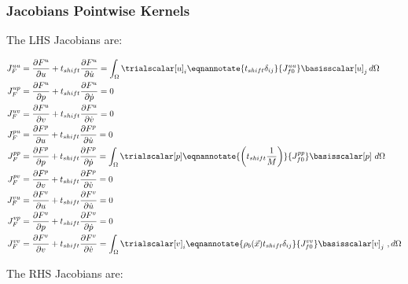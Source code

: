 \subsubsection{Jacobians Pointwise Kernels}

The LHS Jacobians are:

\begin{align}
J_F^{uu} &= \frac{\partial F^u}{\partial u} + t_{shift} \frac{\partial F^u}{\partial \dot{u}} =
\int_{\Omega} \trialscalar[u]_{i} \eqnannotate{t_{shift} \delta_{ij}}{J^{uu}_{f0}} \basisscalar[u]_{j} \, d \Omega \\
%
J_F^{up} &= \frac{\partial F^u}{\partial p} + t_{shift} \frac{\partial F^u}{\partial \dot{p}} = 0 \\
%
J_F^{uv} &= \frac{\partial F^u}{\partial v} + t_{shift} \frac{\partial F^u}{\partial \dot{v}} = 0 \\
%
J_F^{pu} &= \frac{\partial F^p}{\partial u} + t_{shift} \frac{\partial F^p}{\partial \dot{u}} = 0 \\
J_F^{pp} &= \frac{\partial F^p}{\partial p} + t_{shift} \frac{\partial F^p}{\partial \dot{p}} = \int_{\Omega} \trialscalar[p]
\eqnannotate{\left(t_{shift} \frac{1}{M}\right)}{J_{f0}^{pp}} \basisscalar[p] \ d\Omega \\
%
J_F^{pv} &= \frac{\partial F^p}{\partial v} + t_{shift} \frac{\partial F^p}{\partial \dot{v}} = 0 \\
%
J_F^{vu} &= \frac{\partial F^v}{\partial u} + t_{shift} \frac{\partial F^v}{\partial \dot{u}} = 0 \\
%
J_F^{vp} &= \frac{\partial F^v}{\partial p} + t_{shift} \frac{\partial F^v}{\partial \dot{p}} = 0 \\
J_F^{vv} &= \frac{\partial F^v}{\partial v} + t_{shift} \frac{\partial F^v}{\partial \dot{v}} =
\int_{\Omega} \trialscalar[v]_{i}\eqnannotate{\rho_{b}(\vec{x}) t_{shift} \delta_{ij}}{J^{vv}_{f0}} \basisscalar[v]_{j} \ , d \Omega
\end{align}

The RHS Jacobians are:

